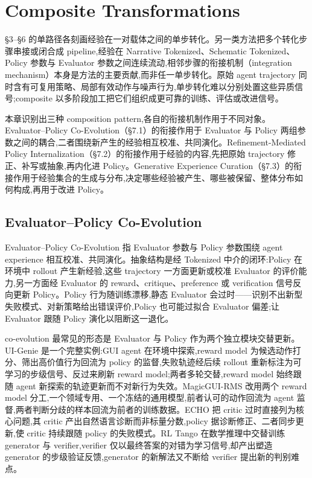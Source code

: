 \section{Composite Transformations}

§3–§6 的单路径各刻画经验在一对载体之间的单步转化。另一类方法把多个转化步骤串接或闭合成 pipeline,经验在 Narrative Tokenized、Schematic Tokenized、Policy 参数与 Evaluator 参数之间连续流动,相邻步骤的衔接机制（integration mechanism）本身是方法的主要贡献,而非任一单步转化。原始 agent trajectory 同时含有可复用策略、局部有效动作与噪声行为,单步转化难以分别处置这些异质信号;composite 以多阶段加工把它们组织成更可靠的训练、评估或改进信号。

本章识别出三种 composition pattern,各自的衔接机制作用于不同对象。Evaluator–Policy Co-Evolution（§7.1）的衔接作用于 Evaluator 与 Policy 两组参数之间的耦合,二者围绕新产生的经验相互校准、共同演化。Refinement-Mediated Policy Internalization（§7.2）的衔接作用于经验的内容,先把原始 trajectory 修正、补写或抽象,再内化进 Policy。Generative Experience Curation（§7.3）的衔接作用于经验集合的生成与分布,决定哪些经验被产生、哪些被保留、整体分布如何构成,再用于改进 Policy。

\subsection{Evaluator–Policy Co-Evolution}

Evaluator–Policy Co-Evolution 指 Evaluator 参数与 Policy 参数围绕 agent experience 相互校准、共同演化。抽象结构是经 Tokenized 中介的闭环:Policy 在环境中 rollout 产生新经验,这些 trajectory 一方面更新或校准 Evaluator 的评价能力,另一方面经 Evaluator 的 reward、critique、preference 或 verification 信号反向更新 Policy。Policy 行为随训练漂移,静态 Evaluator 会过时——识别不出新型失败模式、对新策略给出错误评价,Policy 也可能过拟合 Evaluator 偏差;让 Evaluator 跟随 Policy 演化以阻断这一退化。

co-evolution 最常见的形态是 Evaluator 与 Policy 作为两个独立模块交替更新。UI-Genie \cite{Xia25e} 是一个完整实例:GUI agent 在环境中探索,reward model 为候选动作打分、筛出高价值行为回流为 policy 的监督,失败轨迹经后续 rollout 重新标注为可学习的步级信号、反过来刷新 reward model;两者多轮交替,reward model 始终跟随 agent 新探索的轨迹更新而不对新行为失效。MagicGUI-RMS \cite{Li26n} 改用两个 reward model 分工,一个领域专用、一个冻结的通用模型,前者认可的动作回流为 agent 监督,两者判断分歧的样本回流为前者的训练数据。ECHO \cite{Li26l} 把 critic 过时直接列为核心问题,其 critic 产出自然语言诊断而非标量分数,policy 据诊断修正、二者同步更新,使 critic 持续跟随 policy 的失败模式。RL Tango \cite{Zha25y} 在数学推理中交替训练 generator 与 verifier,verifier 仅以最终答案的对错为学习信号,却产出塑造 generator 的步级验证反馈,generator 的新解法又不断给 verifier 提出新的判别难点。

